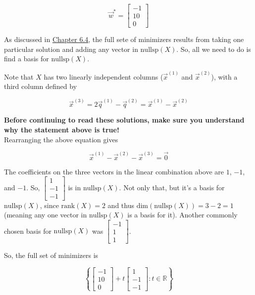 \documentclass[11pt]{article}
\begin{document}
\begin{prob}
\begin{subprob}
\begin{solution}
$$\vec w^* = \begin{bmatrix}-1\\10\\0\end{bmatrix}$$

As discussed in \href{https://notes.eecs245.org/linear-transformations-and-projections/complete-solution/\#finding-all-solutions}{Chapter 6.4}, the full sete of minimizers results from taking one particular solution and adding any vector in $\text{nullsp}(X)$. So, all we need to do is find a basis for $\text{nullsp}(X)$.

Note that $X$ has two linearly independent columns ($\vec x^{(1)}$ and $\vec x^{(2)}$), with a third column defined by

$$\vec x^{(3)} = 2 \vec q^{(1)}-\vec q^{(2)} = \vec x^{(1)} - \vec x^{(2)}$$

\textbf{Before continuing to read these solutions, make sure you understand why the statement above is true!} \\

Rearranging the above equation gives

$$\vec x^{(1)} - \vec x^{(2)} - \vec x^{(3)} = \vec 0$$

The coefficients on the three vectors in the linear combination above are $1$, $-1$, and $-1$. So, $\begin{bmatrix} 1 \\ -1 \\ -1 \end{bmatrix}$ is in $\text{nullsp}(X)$. Not only that, but it's a basis for $\text{nullsp}(X)$, since $\text{rank}(X) = 2$ and thus $\text{dim}(\text{nullsp}(X)) = 3-2 = 1$ (meaning any one vector in $\text{nullsp}(X)$ is a basis for it). Another commonly chosen basis for $\text{nullsp}(X)$ was $\begin{bmatrix} -1 \\ 1 \\ 1 \end{bmatrix}$.

So, the full set of minimizers is

$$\boxed{\left\{ \begin{bmatrix}-1\\10\\0\end{bmatrix} + t \begin{bmatrix}1\\-1\\-1\end{bmatrix} : t \in \mathbb{R} \right\}}$$
\end{solution}
\end{subprob}

\end{prob}
\end{document}
